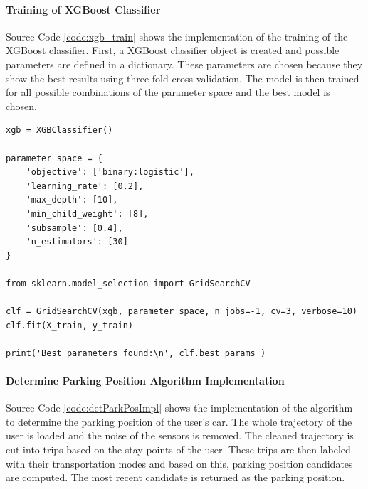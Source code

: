 \paragraph{Training of XGBoost Classifier} Source Code \ref{code:xgb_train} shows the implementation of the training of the XGBoost classifier. First, a XGBoost classifier object is created and possible parameters are defined in a dictionary. These parameters are chosen because they show the best results using three-fold cross-validation. The model is then trained for all possible combinations of the parameter space and the best model is chosen. 

\begin{lstlisting}[style=py, caption={Train XGBoost Classifier}, label={code:xgb_train}]
xgb = XGBClassifier()

parameter_space = {
    'objective': ['binary:logistic'],
    'learning_rate': [0.2],
    'max_depth': [10],
    'min_child_weight': [8],
    'subsample': [0.4],
    'n_estimators': [30]
}

from sklearn.model_selection import GridSearchCV

clf = GridSearchCV(xgb, parameter_space, n_jobs=-1, cv=3, verbose=10)
clf.fit(X_train, y_train)

print('Best parameters found:\n', clf.best_params_)
\end{lstlisting}{}


\paragraph{Determine Parking Position Algorithm Implementation} Source Code \ref{code:detParkPosImpl} shows the implementation of the algorithm to determine the parking position of the user's car. The whole trajectory of the user is loaded and the noise of the sensors is removed. The cleaned trajectory is cut into trips based on the stay points of the user. These trips are then labeled with their transportation modes and based on this, parking position candidates are computed. The most recent candidate is returned as the parking position.

